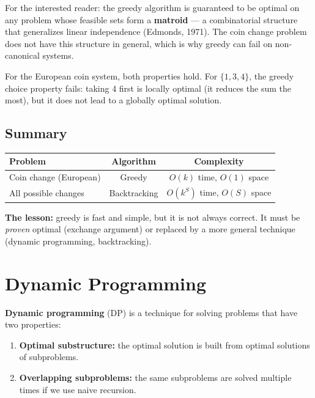 \documentclass[11pt,a4paper]{article}
\begin{document}
For the interested reader: the greedy algorithm is guaranteed to be optimal on any problem whose feasible sets form a \textbf{matroid} --- a combinatorial structure that generalizes linear independence (Edmonds, 1971). The coin change problem does not have this structure in general, which is why greedy can fail on non-canonical systems.

For the European coin system, both properties hold. For \(\{1, 3, 4\}\), the greedy choice property fails: taking 4 first is locally optimal (it reduces the sum the most), but it does not lead to a globally optimal solution.

\subsection{Summary}

\begin{center}
\begin{tabular}{lcc}
\toprule
Problem & Algorithm & Complexity \\
\midrule
Coin change (European) & Greedy & \(O(k)\) time, \(O(1)\) space \\
All possible changes & Backtracking & \(O(k^S)\) time, \(O(S)\) space \\
\bottomrule
\end{tabular}
\end{center}

\textbf{The lesson:} greedy is fast and simple, but it is not always correct. It must be \emph{proven} optimal (exchange argument) or replaced by a more general technique (dynamic programming, backtracking).

\section{Dynamic Programming}

\textbf{Dynamic programming} (DP) is a technique for solving problems that have two properties:
\begin{enumerate}
    \item \textbf{Optimal substructure:} the optimal solution is built from optimal solutions of subproblems.
    \item \textbf{Overlapping subproblems:} the same subproblems are solved multiple times if we use naive recursion.
\end{enumerate}
\end{document}
